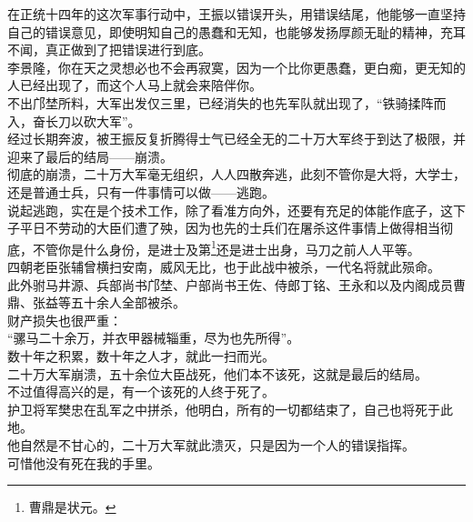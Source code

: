 \begin{multicols}{\theparacolNo}
在正统十四年的这次军事行动中，王振以错误开头，用错误结尾，他能够一直坚持自己的错误意见，即使明知自己的愚蠢和无知，也能够发扬厚颜无耻的精神，充耳不闻，真正做到了把错误进行到底。\\

李景隆，你在天之灵想必也不会再寂寞，因为一个比你更愚蠢，更白痴，更无知的人已经出现了，而这个人马上就会来陪伴你。\\

不出邝埜所料，大军出发仅三里，已经消失的也先军队就出现了，“铁骑揉阵而入，奋长刀以砍大军”。\\

经过长期奔波，被王振反复折腾得士气已经全无的二十万大军终于到达了极限，并迎来了最后的结局——崩溃。\\

彻底的崩溃，二十万大军毫无组织，人人四散奔逃，此刻不管你是大将，大学士，还是普通士兵，只有一件事情可以做——逃跑。\\

说起逃跑，实在是个技术工作，除了看准方向外，还要有充足的体能作底子，这下子平日不劳动的大臣们遭了殃，因为也先的士兵们在屠杀这件事情上做得相当彻底，不管你是什么身份，是进士及第\footnote{曹鼎是状元。}还是进士出身，马刀之前人人平等。\\

四朝老臣张辅曾横扫安南，威风无比，也于此战中被杀，一代名将就此殒命。\\

此外驸马井源、兵部尚书邝埜、户部尚书王佐、侍郎丁铭、王永和以及内阁成员曹鼎、张益等五十余人全部被杀。\\

财产损失也很严重：\\

“骡马二十余万，并衣甲器械辎重，尽为也先所得”。\\

数十年之积累，数十年之人才，就此一扫而光。\\

二十万大军崩溃，五十余位大臣战死，他们本不该死，这就是最后的结局。\\

不过值得高兴的是，有一个该死的人终于死了。\\

护卫将军樊忠在乱军之中拼杀，他明白，所有的一切都结束了，自己也将死于此地。\\

他自然是不甘心的，二十万大军就此溃灭，只是因为一个人的错误指挥。\\

可惜他没有死在我的手里。\\


\end{multicols}
